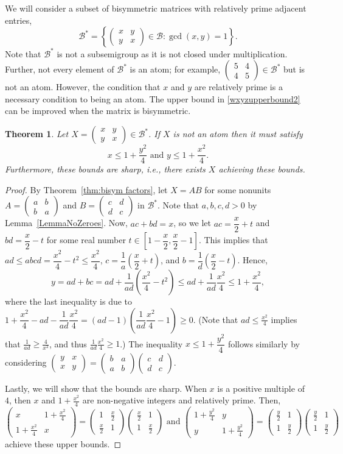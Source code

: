 \documentclass{amsart}
\newcommand{\pmx}[4]{\begin{pmatrix} #1 & #2 \\ #3 & #4 \end{pmatrix}}
\newcommand{\B}{\mathcal{B}}
\newcommand{\Bstar}{\mathcal{B}^*}
\newtheorem{theorem}{Theorem}[section]
\begin{document}
We will consider a subset of bisymmetric matrices with relatively prime adjacent entries,
\[\B^*=\left\{\pmx{x}{y}{y}{x}\in \B: \gcd(x,y)=1\right\}.\]
Note that $\B^*$ is not a subsemigroup as it is not closed under multiplication. Further, not every element of $\B^*$ is an atom; for example, $\pmx{5}{4}{4}{5}\in \B^*$ but is not an atom. However, the condition that $x$ and $y$ are relatively prime is a necessary condition to being an atom.  The upper bound in \cref{wxyzupperbound2} can be improved when the matrix is bisymmetric.




\begin{theorem}\label{cor: upperboundBisym} Let $X=\pmx{x}{y}{y}{x} \in \Bstar$. If $X$ is not an atom then it must satisfy
$$x\leq1+\frac{y^2}{4}\text{ and }y\leq1+\frac{x^2}{4}.$$
Furthermore, these bounds are sharp, i.e., there exists $X$ achieving these bounds.
\end{theorem}

\begin{proof}
By Theorem~\ref{thm:bisym factors}, let $X=AB$ for some nonunits $A=\pmx{a}{b}{b}{a}$ and $B=\pmx{c}{d}{d}{c}$ in $\Bstar$. Note that $a,b,c,d>0$ by Lemma~\ref{LemmaNoZeroes}. Now, $ac+bd=x$, so we let $ac=\dfrac{x}{2}+t$ and $bd=\dfrac{x}{2}-t$ for some real number $t\in\left[1-\dfrac{x}{2},\dfrac{x}{2}-1\right]$. This implies that $ad\leq abcd=\dfrac{x^2}{4}-t^2\leq\dfrac{x^2}{4}$, $c=\dfrac{1}{a}\left(\dfrac{x}{2}+t\right)$, and $b=\dfrac{1}{d}\left(\dfrac{x}{2}-t\right)$. Hence,
$$y=ad+bc=ad+\frac{1}{ad}\left(\frac{x^2}{4}-t^2\right)\leq ad+\frac{1}{ad}\frac{x^2}{4}\leq1+\frac{x^2}{4},$$
where the last inequality is due to $1+\dfrac{x^2}{4}-ad-\dfrac{1}{ad}\dfrac{x^2}{4}=(ad-1)\left(\dfrac{1}{ad}\dfrac{x^2}{4}-1\right)\geq0$. (Note that $ad\leq \frac{x^2}{4}$ implies that $\frac{1}{ad}\geq \frac{4}{x^2}$, and thus $\frac{1}{ad}\frac{x^2}{4}\geq 1$.) The inequality $x\leq1+\dfrac{y^2}{4}$ follows similarly by considering $\pmx{y}{x}{x}{y}=\pmx{b}{a}{a}{b}\pmx{c}{d}{d}{c}$. 

Lastly, we will show that the bounds are sharp. When $x$ is a positive multiple of $4$, then $x$ and $1+\frac{x^2}{4}$ are non-negative integers and relatively prime. Then,
$$\pmx{x}{1+\frac{x^2}{4}}{1+\frac{x^2}{4}}{x}=\pmx{1}{\frac{x}{2}}{\frac{x}{2}}{1}\pmx{\frac{x}{2}}{1}{1}{\frac{x}{2}}\text{ and }\pmx{1+\frac{y^2}{4}}{y}{y}{1+\frac{y^2}{4}}=\pmx{\frac{y}{2}}{1}{1}{\frac{y}{2}}\pmx{\frac{y}{2}}{1}{1}{\frac{y}{2}}$$
achieve these upper bounds.
\end{proof}
\end{document}
